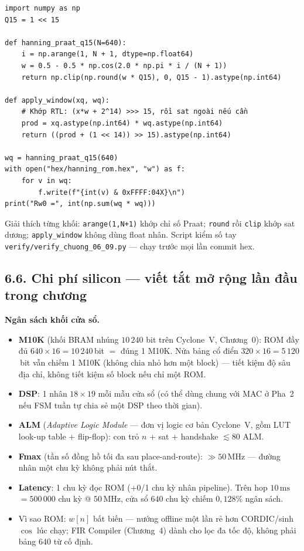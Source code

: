 \begin{verbatim}
import numpy as np
Q15 = 1 << 15

def hanning_praat_q15(N=640):
    i = np.arange(1, N + 1, dtype=np.float64)
    w = 0.5 - 0.5 * np.cos(2.0 * np.pi * i / (N + 1))
    return np.clip(np.round(w * Q15), 0, Q15 - 1).astype(np.int64)

def apply_window(xq, wq):
    # Khớp RTL: (x*w + 2^14) >>> 15, rồi sat ngoài nếu cần
    prod = xq.astype(np.int64) * wq.astype(np.int64)
    return ((prod + (1 << 14)) >> 15).astype(np.int64)

wq = hanning_praat_q15(640)
with open("hex/hanning_rom.hex", "w") as f:
    for v in wq:
        f.write(f"{int(v) & 0xFFFF:04X}\n")
print("Rw0 =", int(np.sum(wq * wq)))
\end{verbatim}
Giải thích từng khối: \texttt{arange(1,N+1)} khớp chỉ số Praat; \texttt{round} rồi \texttt{clip} khớp sat dương; \texttt{apply\_window} không dùng float nhân.
Script kiểm số tay \texttt{verify/verify\_chuong\_06\_09.py} --- chạy trước mọi lần commit hex.

\subsection*{6.6. Chi phí silicon --- viết tắt mở rộng lần đầu trong chương}

\begin{costbox}
\textbf{Ngân sách khối cửa sổ.}
\begin{itemize}[leftmargin=1.2em]
\item \textbf{M10K} (khối BRAM nhúng $10\,240$ bit trên Cyclone~V, Chương~0): ROM đầy đủ $640\times 16 = 10\,240$\,bit $=$ đúng 1 M10K. Nửa bảng cổ điển $320\times 16 = 5\,120$\,bit vẫn chiếm 1 M10K (không chia nhỏ hơn một block) --- tiết kiệm độ sâu địa chỉ, không tiết kiệm số block nếu chỉ một ROM.
\item \textbf{DSP}: 1 nhân $18\times 19$ mỗi mẫu cửa sổ (có thể dùng chung với MAC ở Pha~2 nếu FSM tuần tự chia sẻ một DSP theo thời gian).
\item \textbf{ALM} (\emph{Adaptive Logic Module} --- đơn vị logic cơ bản Cyclone~V, gồm LUT look-up table + flip-flop): con trỏ $n$ + sat + handshake $\lesssim 80$ ALM.
\item \textbf{Fmax} (tần số đồng hồ tối đa sau place-and-route): $\gg 50\,\text{MHz}$ --- đường nhân một chu kỳ không phải nút thắt.
\item \textbf{Latency}: 1 chu kỳ đọc ROM (+0/1 chu kỳ nhân pipeline). Trên hop $10\,\text{ms}$ $= 500\,000$ chu kỳ @ $50\,\text{MHz}$, cửa sổ $640$ chu kỳ chiếm $0{,}128\%$ ngân sách.
\item Vì sao ROM: $w[n]$ bất biến --- nướng offline một lần rẻ hơn CORDIC/sinh $\cos$ lúc chạy; FIR Compiler (Chương~4) dành cho lọc đa tốc độ, không phải bảng 640 từ cố định.
\end{itemize}
\end{costbox}

